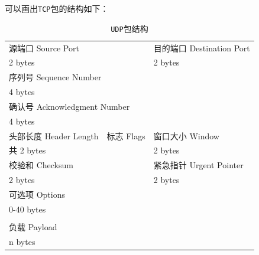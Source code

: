 \documentclass{article}
\begin{document}
可以画出\texttt{TCP}包的结构如下：

\begin{table}[H]
  \centering
  \begin{tabularx}{0.8\textwidth}{|*{4}{X|}}
    \hline
    \multicolumn{2}{|X|}{源端口 Source Port}     & \multicolumn{2}{X|}{目的端口 Destination Port}                                          \\
    \multicolumn{2}{|X|}{2 bytes}                & \multicolumn{2}{X|}{2 bytes}                                                            \\
    \hline
    \multicolumn{4}{|X|}{序列号 Sequence Number}                                                                                           \\
    \multicolumn{4}{|X|}{4 bytes}                                                                                                          \\
    \hline
    \multicolumn{4}{|X|}{确认号 Acknowledgment Number}                                                                                     \\
    \multicolumn{4}{|X|}{4 bytes}                                                                                                          \\
    \hline
    \multicolumn{1}{|X|}{头部长度 Header Length} & \multicolumn{1}{X|}{标志 Flags}                & \multicolumn{2}{X|}{窗口大小 Window}   \\
    \multicolumn{2}{|X|}{共 2 bytes}             & \multicolumn{2}{X|}{2 bytes}                                                            \\
    \hline
    \multicolumn{2}{|X|}{校验和 Checksum}        & \multicolumn{2}{X|}{紧急指针 Urgent Pointer}                                            \\
    \multicolumn{2}{|X|}{2 bytes}                & \multicolumn{2}{X|}{2 bytes}                                                            \\
    \hline
    \multicolumn{4}{|X|}{可选项 Options}                                                                                                   \\
    \multicolumn{4}{|X|}{0-40 bytes}                                                                                                       \\
    \hline
                                                 &                                                &                                      & \\
    \hline
    \multicolumn{4}{|X|}{负载 Payload}                                                                                                     \\
    \multicolumn{4}{|X|}{n bytes}                                                                                                          \\
    \hline
  \end{tabularx}
  \caption{\texttt{UDP}包结构}
\end{table}
\end{document}
